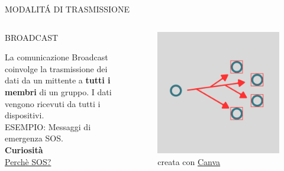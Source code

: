 \documentclass[aspectratio=1610,handout]{beamer}
\begin{document}
\begin{frame}{MODALIT\'A DI TRASMISSIONE}
    \begin{columns}
        \begin{alertblock}{BROADCAST}
            \begin{minipage}{0.96\linewidth}
                \justifying
                La comunicazione Broadcast coinvolge la trasmissione dei dati da un mittente a \textbf{tutti i 
                membri} di un gruppo. I dati vengono ricevuti da tutti i dispositivi.\\
                ESEMPIO: Messaggi di emergenza SOS.\\
                \bigskip
                \tiny{\textbf{Curiosità}}\\
                \tiny{\href{https://www.geopop.it/sos-significato-storia-segnale-universale-soccorso/}{Perchè SOS?}}
            \end{minipage}
        \end{alertblock}
           \begin{figure}
               \includegraphics[width=\linewidth]{img/broadcast.png}
               \caption{{creata con \href{https://www.canva.com}{Canva}}}
           \end{figure}
    \end{columns}
\end{frame}
\end{document}
